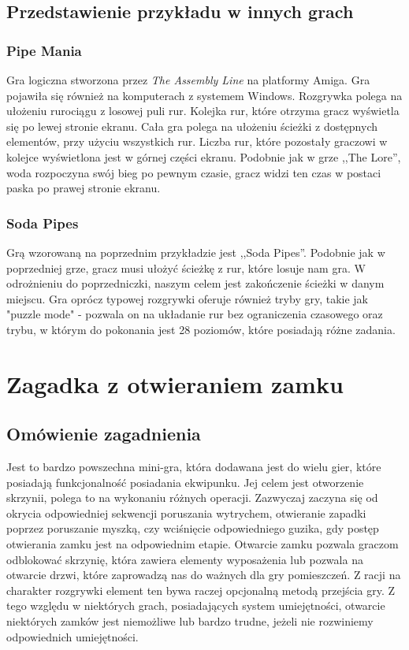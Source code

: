 \documentclass[oneside,polski,logo]{amuthesis}
\begin{document}
\subsection{Przedstawienie przykładu w innych grach}
\subsubsection{Pipe Mania}
\par Gra logiczna stworzona przez \emph{The Assembly Line} na platformy Amiga. Gra pojawiła się również na komputerach z systemem Windows. Rozgrywka polega na ułożeniu rurociągu z losowej puli rur. Kolejka rur, które otrzyma gracz wyświetla się po lewej stronie ekranu. Cała gra polega na ułożeniu ścieżki z dostępnych elementów, przy użyciu wszystkich rur. Liczba rur, które pozostały graczowi w kolejce wyświetlona jest w górnej części ekranu. Podobnie jak w grze ,,The Lore'', woda rozpoczyna swój bieg po pewnym czasie, gracz widzi ten czas w postaci paska po prawej stronie ekranu. \cite{pipemania}

\subsubsection{Soda Pipes}
\par Grą wzorowaną na poprzednim przykładzie jest ,,Soda Pipes''. Podobnie jak w poprzedniej grze, gracz musi ułożyć ścieżkę z rur, które losuje nam gra. W odrożnieniu do poprzedniczki, naszym celem jest zakończenie ścieżki w danym miejscu. Gra oprócz typowej rozgrywki oferuje również tryby gry, takie jak "puzzle mode" - pozwala on na układanie rur bez ograniczenia czasowego oraz trybu, w którym do pokonania jest 28 poziomów, które posiadają różne zadania. \cite{sp}
\section{Zagadka z otwieraniem zamku}
\subsection{Omówienie zagadnienia}
\par Jest to bardzo powszechna mini-gra, która dodawana jest do wielu gier, które posiadają funkcjonalność posiadania ekwipunku. Jej celem jest otworzenie skrzynii, polega to na wykonaniu różnych operacji. Zazwyczaj zaczyna się od okrycia odpowiedniej sekwencji poruszania wytrychem, otwieranie zapadki poprzez poruszanie myszką, czy wciśnięcie odpowiedniego guzika, gdy postęp otwierania zamku jest na odpowiednim etapie. Otwarcie zamku pozwala graczom odblokować skrzynię, która zawiera elementy wyposażenia lub pozwala na otwarcie drzwi, które zaprowadzą nas do ważnych dla gry pomieszczeń. Z racji na charakter rozgrywki element ten bywa raczej opcjonalną metodą przejścia gry. Z tego względu w niektórych grach, posiadających system umiejętności, otwarcie niektórych zamków jest niemożliwe lub bardzo trudne, jeżeli nie rozwiniemy odpowiednich umiejętności.
\end{document}
